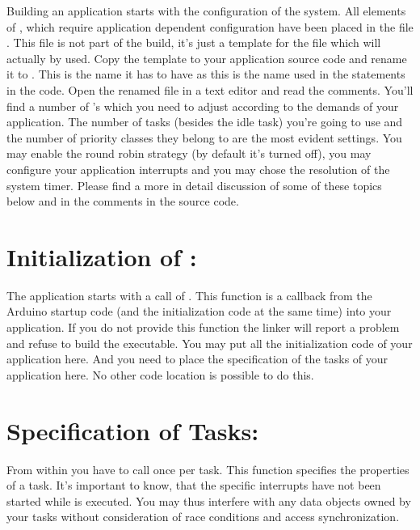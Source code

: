 Building an \rtos{} application starts with the configuration of the
system. All elements of \rtos{}, which require application dependent
configuration have been placed in the file .
This file is not part of the build, it's just a template for the file which
will actually by used. Copy the template to your application source code
and rename it to . This is the name it has to have as
this is the name used in the  statements in the code.
Open the renamed file in a text editor and read the comments. You'll find
a number of 's which you need to adjust according to the
demands of your application. The number of tasks (besides the idle task)
you're going to use and the number of priority classes they belong to are
the most evident settings. You may enable the round robin strategy (by
default it's turned off), you may configure your application interrupts
and you may chose the resolution of the system timer. Please find a more
in detail discussion of some of these topics below and in the comments in
the source code.

\section{Initialization of \rtos: }

The \rtos{} application starts with a call of . This function
is a callback from the Arduino startup code (and the \rtos{} initialization
code at the same time) into your application. If you do not provide this
function the linker will report a problem and refuse to build the
executable. You may put all the initialization code of your application
here. And you need to place the specification of the tasks of your
application here. No other code location is possible to do this.


\section{Specification of Tasks: }

From within  you have to call 
once per task. This function specifies the properties of a task. It's
important to know, that the specific \rtos{} interrupts have not been
started while  is executed. You may thus interfere with any
data objects owned by your tasks without consideration of race conditions
and access synchronization.

